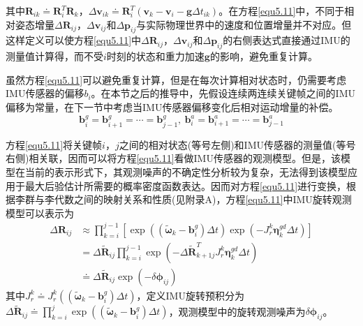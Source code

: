 其中$\boldsymbol{R}_{ik} \doteq \boldsymbol{R}_i^T \boldsymbol{R}_k$，$\Delta \boldsymbol{v}_{ik} \doteq \boldsymbol{R}_i^T \left( \boldsymbol{v}_k -\boldsymbol{v}_i-\boldsymbol{g}\Delta t_{ik} \right)$。在方程\eqref{equ5.11}中，不同于相对姿态增量$\Delta \boldsymbol{R}_{ij}$，$\Delta \boldsymbol{v}_{ij}$和$\Delta \boldsymbol{p}_{ij}$与实际物理世界中的速度和位置增量并不对应。但这样定义可以使方程\eqref{equ5.11}中$\Delta \boldsymbol{R}_{ij}$，$\Delta \boldsymbol{v}_{ij}$和$\Delta \boldsymbol{p}_{ij}$的右侧表达式直接通过IMU的测量值计算得，而不受$i$时刻的状态和重力加速$\boldsymbol{g}$的影响，避免重复计算。

虽然方程\eqref{equ5.11}可以避免重复计算，但是在每次计算相对状态时，仍需要考虑IMU传感器的偏移$b_i$。在本节之后的推导中，先假设连续两连续关键帧之间的IMU偏移为常量，在下一节中考虑当IMU传感器偏移变化后相对运动增量的补偿。
\begin{equation}
\label{equ5.12}
\boldsymbol{b}_i^g = \boldsymbol{b}_{i+1}^g = \cdots = \boldsymbol{b}_{j-1}^g, \  \boldsymbol{b}_i^a = \boldsymbol{b}_{i+1}^a = \cdots = \boldsymbol{b}_{j-1}^a
\end{equation}

方程\eqref{equ5.11}将关键帧$i$，$j$之间的相对状态(等号左侧)和IMU传感器的测量值(等号右侧)相关联，因而可以将方程\eqref{equ5.11}看做IMU传感器的观测模型。但是，该模型在当前的表示形式下，其观测噪声的不确定性分析较为复杂，无法得到该模型应用于最大后验估计所需要的概率密度函数表达。因而对方程\eqref{equ5.11}进行变换，根据李群与李代数之间的映射关系和性质(见附录A)，方程\eqref{equ5.11}中IMU旋转观测模型可以表示为
\begin{equation}
\label{equ5.13}
\begin{aligned}
\Delta \boldsymbol{R}_{ij} & \approx \prod\limits_{k=i}^{j-1} \left[ \exp \left( \left(  \widetilde{\boldsymbol{\omega}}_k - \boldsymbol{b}_i^g \right) \Delta t  \right)  
\exp \left(  -J_r^k \boldsymbol{\eta}_k^{gd} \Delta t  \right)\right] \\
&= \Delta \widetilde{\boldsymbol{R}}_{ij} \prod\limits_{k=i}^{j-1}\exp \left( -\Delta \widetilde{\boldsymbol{R}}_{k+1j}^T  J_r^k \boldsymbol{\eta}_k^{gd} \Delta t  \right) \\ 
& \doteq \Delta \widetilde{\boldsymbol{R}}_{ij} \exp \left(  -\delta \boldsymbol{\phi}_{ij}  \right)
\end{aligned}
\end{equation}
其中$J_r^k \doteq J_r^k( \left( \widetilde{\boldsymbol{\omega}}_k - \boldsymbol{b}_i^g \right) \Delta t)$，定义IMU旋转预积分为$\Delta \widetilde{\boldsymbol{R}}_{ij} \doteq \prod_{k=i}^j\exp \left( \left( \widetilde{\boldsymbol{\omega}}_k - \boldsymbol{b}_i^g \right) \Delta t  \right)$，观测模型中的旋转观测噪声为$\delta \boldsymbol{\phi}_{ij}$。

